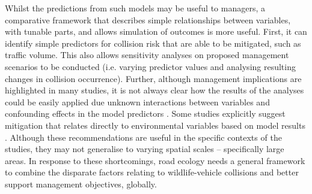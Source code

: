 Whilst the predictions from such models may be useful to managers, a comparative framework that describes simple relationships between variables, with tunable parts, and allows simulation of outcomes is more useful. First, it can identify simple predictors for collision risk that are able to be mitigated, such as traffic volume. This also allows sensitivity analyses on proposed management scenarios to be conducted (i.e. varying predictor values and analysing resulting changes in collision occurrence). Further, although management implications are highlighted in many studies, it is not always clear how the results of the analyses could be easily applied due unknown interactions between variables and confounding effects in the model predictors \citep{guns11}. Some studies explicitly suggest mitigation that relates directly to environmental variables based on model results \citep[e.g.][]{gril09}.  Although these recommendations are useful in the specific contexts of the studies, they may not generalise to varying spatial scales -- specifically large areas. In response to these shortcomings, road ecology needs a general framework to combine the disparate factors relating to wildlife-vehicle collisions \citep{clev15} and better support management objectives, globally.
%

